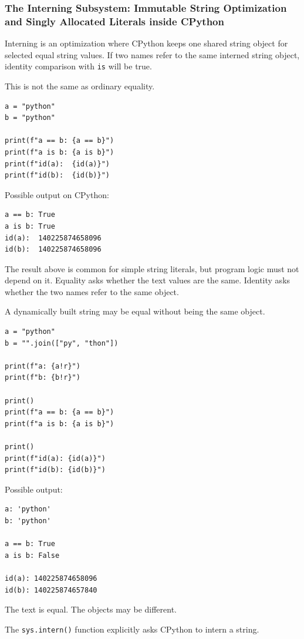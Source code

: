 \subsubsection{The Interning Subsystem: Immutable String Optimization and Singly Allocated Literals inside CPython}

Interning is an optimization where CPython keeps one shared string object for selected equal string values. If two names refer to the same interned string object, identity comparison with \texttt{is} will be true.

This is not the same as ordinary equality.

\begin{verbatim}
a = "python"
b = "python"

print(f"a == b: {a == b}")
print(f"a is b: {a is b}")
print(f"id(a):  {id(a)}")
print(f"id(b):  {id(b)}")
\end{verbatim}

Possible output on CPython:

\begin{verbatim}
a == b: True
a is b: True
id(a):  140225874658096
id(b):  140225874658096
\end{verbatim}

The result above is common for simple string literals, but program logic must not depend on it. Equality asks whether the text values are the same. Identity asks whether the two names refer to the same object.

A dynamically built string may be equal without being the same object.

\begin{verbatim}
a = "python"
b = "".join(["py", "thon"])

print(f"a: {a!r}")
print(f"b: {b!r}")

print()
print(f"a == b: {a == b}")
print(f"a is b: {a is b}")

print()
print(f"id(a): {id(a)}")
print(f"id(b): {id(b)}")
\end{verbatim}

Possible output:

\begin{verbatim}
a: 'python'
b: 'python'

a == b: True
a is b: False

id(a): 140225874658096
id(b): 140225874657840
\end{verbatim}

The text is equal. The objects may be different.

The \texttt{sys.intern()} function explicitly asks CPython to intern a string.

